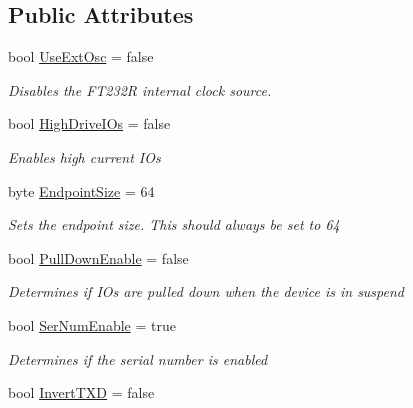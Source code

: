 \subsection*{Public Attributes}
\begin{DoxyCompactItemize}
\item 
bool \mbox{\hyperlink{class_f_t_d2_x_x___n_e_t_1_1_f_t_d_i_1_1_f_t232_r___e_e_p_r_o_m___s_t_r_u_c_t_u_r_e_a09e91bc353a7b99fdbe3ba6fc66e234b}{Use\+Ext\+Osc}} = false
\begin{DoxyCompactList}\small\item\em Disables the F\+T232R internal clock source. \end{DoxyCompactList}\item 
bool \mbox{\hyperlink{class_f_t_d2_x_x___n_e_t_1_1_f_t_d_i_1_1_f_t232_r___e_e_p_r_o_m___s_t_r_u_c_t_u_r_e_a0e2f71ebcfa4e94e81d94701d1745864}{High\+Drive\+I\+Os}} = false
\begin{DoxyCompactList}\small\item\em Enables high current I\+Os \end{DoxyCompactList}\item 
byte \mbox{\hyperlink{class_f_t_d2_x_x___n_e_t_1_1_f_t_d_i_1_1_f_t232_r___e_e_p_r_o_m___s_t_r_u_c_t_u_r_e_a9588d359fe1c4ef5aaf16dd348196afc}{Endpoint\+Size}} = 64
\begin{DoxyCompactList}\small\item\em Sets the endpoint size. This should always be set to 64 \end{DoxyCompactList}\item 
bool \mbox{\hyperlink{class_f_t_d2_x_x___n_e_t_1_1_f_t_d_i_1_1_f_t232_r___e_e_p_r_o_m___s_t_r_u_c_t_u_r_e_afba4376954e04b07d782286712c8fcd3}{Pull\+Down\+Enable}} = false
\begin{DoxyCompactList}\small\item\em Determines if I\+Os are pulled down when the device is in suspend \end{DoxyCompactList}\item 
bool \mbox{\hyperlink{class_f_t_d2_x_x___n_e_t_1_1_f_t_d_i_1_1_f_t232_r___e_e_p_r_o_m___s_t_r_u_c_t_u_r_e_a2af24babbff3c27509d221150a6a00d8}{Ser\+Num\+Enable}} = true
\begin{DoxyCompactList}\small\item\em Determines if the serial number is enabled \end{DoxyCompactList}\item 
bool \mbox{\hyperlink{class_f_t_d2_x_x___n_e_t_1_1_f_t_d_i_1_1_f_t232_r___e_e_p_r_o_m___s_t_r_u_c_t_u_r_e_ae30a55306e2728bb55112dc07b2b19ed}{Invert\+T\+XD}} = false

\end{DoxyCompactItemize}

